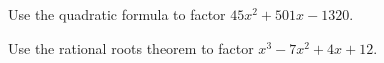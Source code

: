 \documentclass[11pt,letterpaper]{article}
\begin{document}

 Use the quadratic formula to factor $45x^2 + 501x - 1320$.



\newpage



 Use the rational roots theorem to factor $x^3 - 7x^2 + 4x + 12$. 
\end{document}
